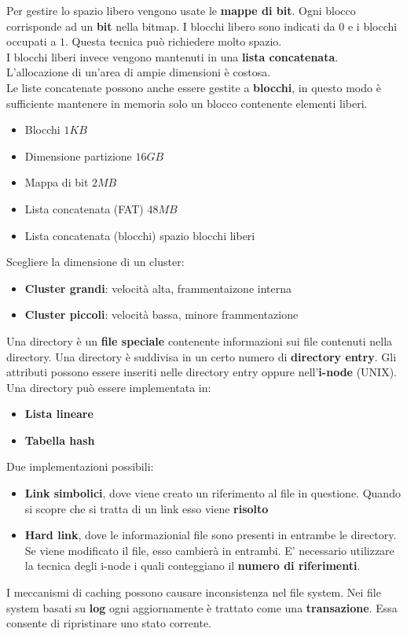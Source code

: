 \documentclass{article}
\begin{document}
Per gestire lo spazio libero vengono usate le \textbf{mappe di bit}. Ogni blocco corrisponde ad un \textbf{bit} nella bitmap. I blocchi libero sono indicati da $0$ e i blocchi occupati a $1$. Questa tecnica può richiedere molto spazio.\\
I blocchi liberi invece vengono mantenuti in una \textbf{lista concatenata}. L'allocazione di un'area di ampie dimensioni è costosa.\\
Le liste concatenate possono anche essere gestite a \textbf{blocchi}, in questo modo è sufficiente mantenere in memoria solo un blocco contenente elementi liberi.
\begin{itemize}
  \item Blocchi $1KB$
  \item Dimensione partizione $16GB$
  \item Mappa di bit $2MB$
  \item Lista concatenata (FAT) $48MB$
  \item Lista concatenata (blocchi) spazio blocchi liberi
\end{itemize}
Scegliere la dimensione di un cluster:
\begin{itemize}
  \item \textbf{Cluster grandi}: velocità alta, frammentaizone interna
  \item \textbf{Cluster piccoli}: velocità bassa, minore frammentazione
\end{itemize}
 Una directory è un \textbf{file speciale} contenente informazioni sui file contenuti nella directory. Una directory è suddivisa in un certo numero di \textbf{directory entry}. Gli attributi possono essere inseriti nelle directory entry oppure nell'\textbf{i-node} (UNIX).\\
 Una directory può essere implementata in:
 \begin{itemize}
   \item \textbf{Lista lineare}
   \item \textbf{Tabella hash}
 \end{itemize}
Due implementazioni possibili:
\begin{itemize}
  \item \textbf{Link simbolici}, dove viene creato un riferimento al file in questione. Quando si scopre che si tratta di un link esso viene \textbf{risolto}
  \item \textbf{Hard link}, dove le informazionial file sono presenti in entrambe le directory. Se viene modificato il file, esso cambierà in entrambi. E' necessario utilizzare la tecnica degli i-node i quali conteggiano il \textbf{numero di riferimenti}.
\end{itemize}
I meccanismi di caching possono causare inconsistenza nel file system. Nei file system basati su \textbf{log} ogni aggiornamente è trattato come una \textbf{transazione}. Essa consente di ripristinare uno stato corrente.
\end{document}
